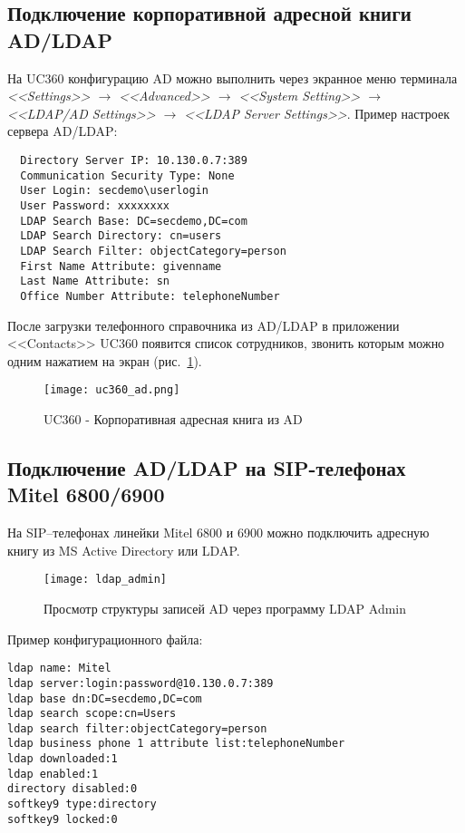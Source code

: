 \subsection{Подключение корпоративной адресной книги AD/LDAP}
На UC360 конфигурацию AD можно выполнить через экранное меню терминала {\em <<Settings>> $\rightarrow$ <<Advanced>> $\rightarrow$ <<System Setting>> $\rightarrow$ <<LDAP/AD Settings>> $\rightarrow$ <<LDAP Server Settings>>}. Пример настроек сервера AD/LDAP:
\begin{lstlisting}
  Directory Server IP: 10.130.0.7:389
  Communication Security Type: None
  User Login: secdemo\userlogin
  User Password: xxxxxxxx
  LDAP Search Base: DC=secdemo,DC=com
  LDAP Search Directory: cn=users
  LDAP Search Filter: objectCategory=person
  First Name Attribute: givenname
  Last Name Attribute: sn
  Office Number Attribute: telephoneNumber
\end{lstlisting}

После загрузки телефонного справочника из AD/LDAP в приложении <<Contacts>> UC360 появится список сотрудников, звонить которым можно одним нажатием на экран (рис.~\ref{img:uc360_ad}).

\begin{figure}[!ht]
  \center
  \texttt{[image: uc360\_ad.png]}
  \caption{UC360 - Корпоративная адресная книга из AD}
  \label{img:uc360_ad}
\end{figure}


\subsection{Подключение AD/LDAP на SIP-телефонах Mitel 6800/6900}
На SIP--телефонах линейки Mitel 6800 и 6900 можно подключить адресную книгу из MS Active Directory или LDAP.

\begin{figure}[!ht]
  \center
  \texttt{[image: ldap\_admin]}
  \caption{Просмотр структуры записей AD через программу LDAP Admin}
  \label{img:ldap_admin}
\end{figure}

Пример конфигурационного файла:
\begin{lstlisting}
ldap name: Mitel
ldap server:login:password@10.130.0.7:389
ldap base dn:DC=secdemo,DC=com
ldap search scope:cn=Users
ldap search filter:objectCategory=person
ldap business phone 1 attribute list:telephoneNumber
ldap downloaded:1
ldap enabled:1
directory disabled:0
softkey9 type:directory
softkey9 locked:0
\end{lstlisting}

